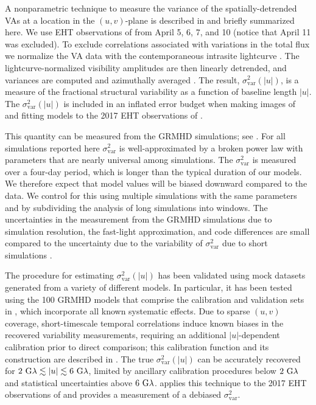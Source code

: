 A nonparametric technique to measure the variance of the spatially-detrended VAs at a location in the $(u,v)$-plane is described in \citet{NoiseModeling} and briefly summarized here.  We use EHT observations of \sgra from April 5, 6, 7, and 10 (notice that April 11 was excluded).  To exclude correlations associated with  variations in the total flux we normalize the VA data with the contemporaneous intrasite lightcurve \citep{Georgiev_2022}.  The lightcurve-normalized visibility amplitudes are then linearly detrended, and variances are computed and azimuthally averaged \citep{NoiseModeling}.  The result, $\sigma_\text{var}^2 (|u|)$, is a measure of the fractional structural variability as a function of baseline length $|u|$.  The $\sigma_\text{var}^2 (|u|)$ is included in an inflated error budget when making images of and fitting models to the 2017 EHT observations of \sgra {}.

This quantity can be measured from the GRMHD simulations; see \citet{Georgiev_2022}. For all simulations reported here $\sigma_\text{var}^2$ is well-approximated by a broken power law with parameters that are nearly universal among simulations.
The $\sigma_\text{var}^2$ is measured over a four-day period, which is longer than the typical duration of our models.  We therefore expect that model values will be biased downward compared to the data.  We control for this using multiple simulations with the same parameters and by subdividing the analysis of long simulations into windows.
The uncertainties in the measurement from the GRMHD simulations due to simulation resolution, the fast-light approximation, and code differences are small compared to the uncertainty due to the variability of $\sigma_\text{var}^2$ due to short simulations \citep{Georgiev_2022}.

The procedure for estimating $\sigma_\text{var}^2 (|u|)$ has been validated using mock datasets generated from a variety of different models.  In particular, it has been tested using the 100 GRMHD models that comprise the calibration and validation sets in , which incorporate all known systematic effects.  Due to sparse $(u,v)$ coverage, short-timescale temporal correlations induce known biases in the recovered variability measurements, requiring an additional $|u|$-dependent calibration prior to direct comparison; this calibration function and its construction are described in \citealt{NoiseModeling}.  The true $\sigma_\text{var}^2 (|u|)$ can be accurately recovered for $2~{\rm G}\lambda\lesssim|u|\lesssim6~{\rm G}\lambda$, limited by ancillary calibration procedures below $2~{\rm G}\lambda$ and statistical uncertainties above $6~{\rm G}\lambda$.   applies this technique to the 2017 EHT observations of \sgra and provides a measurement of a debiased $\sigma_\text{var}^2$.

